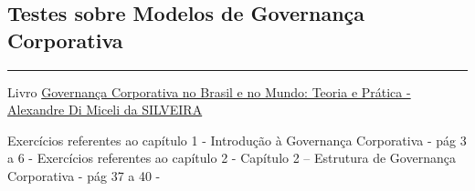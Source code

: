 \documentclass[
]{book}
\begin{document}
\subsection{Testes sobre Modelos de Governança Corporativa}\label{testes-sobre-modelos-de-governanuxe7a-corporativa}

\begin{center}\rule{0.5\linewidth}{0.5pt}\end{center}

Livro \href{https://pdfcoffee.com/governana-corporativa-no-brasil-e-no-mundo-pdf-free.html}{Governança Corporativa no Brasil e no Mundo: Teoria e Prática - Alexandre Di Miceli da SILVEIRA}

Exercícios referentes ao capítulo 1 - Introdução à Governança Corporativa - pág 3 a 6 -
Exercícios referentes ao capítulo 2 - Capítulo 2 -- Estrutura de Governança Corporativa - pág 37 a 40 -
\end{document}
